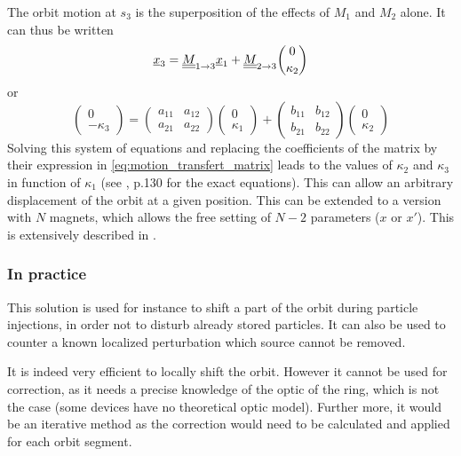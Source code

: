 The orbit motion at $s_3$ is the superposition of the effects of $M_1$ and $M_2$ alone. It can thus be written
\begin{equation}
\underline{x}_3 = \underline{\underline{M}}_{1 \rightarrow 3} \underline{x}_1 + \underline{\underline{M}}_{2 \rightarrow 3} \dbinom{0}{\kappa_2}
\end{equation}
or
\begin{equation*}
\begin{pmatrix} 0 \\ -\kappa_3 \end{pmatrix} =
\begin{pmatrix} a_{11} & a_{12} \\ a_{21} & a_{22} \end{pmatrix} \begin{pmatrix} 0 \\ \kappa_1 \end{pmatrix} +
\begin{pmatrix} b_{11} & b_{12} \\ b_{21} & b_{22} \end{pmatrix} \begin{pmatrix} 0 \\ \kappa_2 \end{pmatrix}
\end{equation*}
Solving this system of equations and replacing the coefficients of the matrix by their expression in \cref{eq:motion_transfert_matrix} leads to the values of $\kappa_2$ and $\kappa_3$ in function of $\kappa_1$ (see \cite{book:wille}, p.130 for the exact equations). This can allow an arbitrary displacement of the orbit at a given position. This can be extended to a version with $N$ magnets, which allows the free setting of $N-2$ parameters ($x$ or $x'$). This is extensively described in \cite{book:wille}.

\subsubsection{In practice}
This solution is used for instance to shift a part of the orbit during particle injections, in order not to disturb already stored particles. It can also be used to counter a known localized perturbation which source cannot be removed.

It is indeed very efficient to locally shift the orbit. However it cannot be used for correction, as it needs a precise knowledge of the optic of the ring, which is not the case (some devices have no theoretical optic model). Further more, it would be an iterative method as the correction would need to be calculated and applied for each orbit segment.

